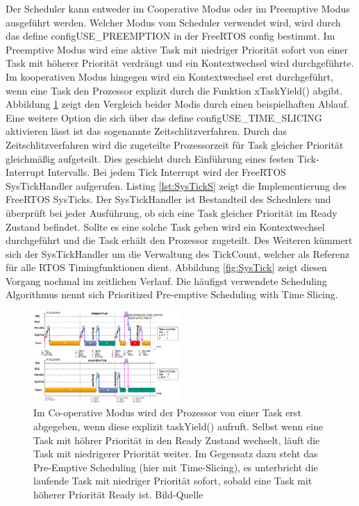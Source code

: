 Der Scheduler kann entweder im Cooperative Modus oder im Preemptive Modus ausgeführt werden. Welcher Modus vom Scheduler verwendet wird, wird durch das define configUSE\_PREEMPTION in der FreeRTOS config bestimmt. Im Preemptive Modus wird eine aktive Task mit niedriger Priorität sofort von einer Task mit höherer Priorität verdrängt und ein Kontextwechsel wird durchgeführte. Im kooperativen Modus hingegen wird ein Kontextwechsel erst durchgeführt, wenn eine Task den Prozessor explizit durch die Funktion xTaskYield() abgibt. Abbildung \ref{fig:PreVSCo} zeigt den Vergleich beider Modis durch einen beispielhaften Ablauf. Eine weitere Option die sich über das define configUSE\_TIME\_SLICING aktivieren lässt ist das sogenannte Zeitschlitzverfahren. Durch das Zeitschlitzverfahren wird die zugeteilte Prozessorzeit für Task gleicher Priorität gleichmäßig aufgeteilt. Dies geschieht durch Ein\-füh\-rung eines festen Tick-Interrupt Intervalls. Bei jedem Tick Interrupt wird der FreeRTOS SysTickHandler aufgerufen. Listing \ref{lst:SysTickS} zeigt die Implementierung des FreeRTOS SysTicks. Der SysTickHandler ist Bestandteil des Schedulers und überprüft bei jeder Ausführung, ob sich eine Task gleicher Priorität im Ready Zustand befindet. Sollte es eine solche Task geben wird ein Kontextwechsel durchgeführt und die Task erhält den Prozessor zugeteilt. Des Weiteren kümmert sich der SysTickHandler um die Verwaltung des TickCount, welcher als Referenz für alle RTOS Timingfunktionen dient. Abbildung \ref{fig:SysTick} zeigt diesen Vorgang nochmal im zeitlichen Verlauf. Die häufigst verwendete Scheduling Algorithmus nennt sich Prioritized Pre-emptive Scheduling with Time Slicing.
\begin{figure}[htb]
	\centering
		\includegraphics[width=0.5\textwidth]{Pictures/EMCUIT/PreemptiveCooperative.png}
	\caption{Im Co-operative Modus wird der Prozessor von einer Task erst abgegeben, wenn diese explizit taskYield() aufruft. Selbst wenn eine Task mit höhrer Priorität in den Ready Zustand wechselt, läuft die Task mit niedrigerer Priorität weiter. Im Gegensatz dazu steht das Pre-Emptive Scheduling (hier mit Time-Slicing), es unterbricht die laufende Task mit niedriger Priorität sofort, sobald eine Task mit höherer Priorität Ready ist. Bild-Quelle~\protect{}}
	\label{fig:PreVSCo}
\end{figure}
